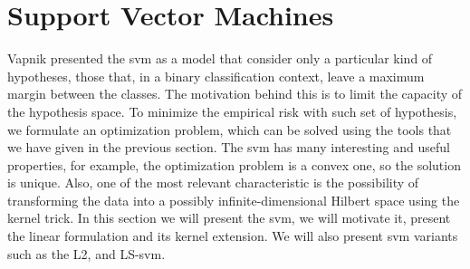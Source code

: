 \section{Support Vector Machines}
Vapnik presented the \acrshort{svm} as a model that consider only a particular kind of hypotheses, those that, in a binary classification context, leave a maximum margin between the classes. The motivation behind this is to limit the capacity of the hypothesis space. To minimize the empirical risk with such set of hypothesis, we formulate an optimization problem, which can be solved using the tools that we have given in the previous section. The \acrshort{svm} has many interesting and useful properties, for example, the optimization problem is a convex one, so the solution is unique. Also, one of the most relevant characteristic is the possibility of transforming the data into a possibly infinite-dimensional Hilbert space using the kernel trick.
In this section we will present the \acrshort{svm}, we will motivate it, present the linear formulation and its kernel extension. We will also present \acrshort{svm} variants such as the L2, and LS-\acrshort{svm}.


